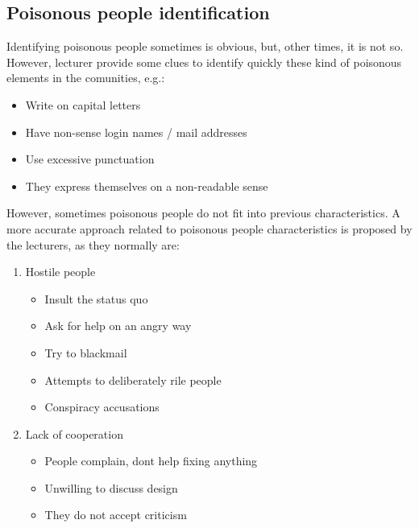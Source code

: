 \documentclass[11pt]{article}
\begin{document}
\subsection{Poisonous people identification}
Identifying poisonous people sometimes is obvious, but, other times, it is not so. However, lecturer provide some clues to identify quickly these kind of poisonous elements in the comunities, e.g.:
\begin{itemize}\itemsep0pt
\item{Write on capital letters}
\item{Have non-sense login names / mail addresses}
\item{Use excessive punctuation}
\item{They express themselves on a non-readable sense}
\end{itemize}
However, sometimes poisonous people do not fit into previous characteristics. A more accurate approach related to poisonous people characteristics is proposed by the lecturers, as they normally are:
\begin{enumerate}
\item{Hostile people}
\begin{itemize}\itemsep0pt
\item{Insult the status quo}
\item{Ask for help on an angry way}
\item{Try to blackmail}
\item{Attempts to deliberately rile people}
\item{Conspiracy accusations}
\end{itemize}
\item{Lack of cooperation}
\begin{itemize}\itemsep0pt
\item{People complain, dont help fixing anything}
\item{Unwilling to discuss design}
\item{They do not accept criticism}
\end{itemize}
\end{enumerate}
\end{document}
